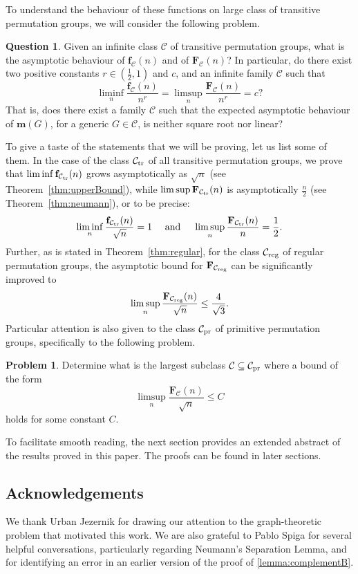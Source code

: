 \documentclass[a4paper]{amsart}
\newcommand{\f}{\mathbf{f}}
\newcommand{\F}{\mathbf{F}}
\newcommand{\m}{\mathbf{m}}
\newcommand{\C}{\mathcal{C}}
\theoremstyle{definition}
\newtheorem{question}[thmx]{Problem}
\newtheorem{vprasanje}[theorem]{Question}
\begin{document}
To understand the behaviour of these functions on large class of transitive permutation groups, we will consider the following problem.
\begin{vprasanje}\label{prob:1}
    Given an infinite class $\C$ of transitive permutation groups, what is the asymptotic behaviour of $\f_\C(n)$ and of $\F_\C(n)$? In particular, do there exist two positive constants $r \in \left(\frac{1}{2} , 1\right)$ and $c$, and an infinite family $\C$
    such that 
    \[ \liminf_n \frac{\f_\C(n)}{n^{r}} = \limsup_n \frac{\F_\C(n)}{n^{r}} = c ?\]
    That is, does there exist a family $\C$ such that the expected asymptotic behaviour of $\m(G)$, for a generic $G\in \C$, is neither square root nor linear?
\end{vprasanje}

To give a taste of the statements that we will be proving, let us list some of them.
In the case of the class $\C_{{\rm tr}}$ of all transitive permutation groups, we prove that $\liminf \f_{\C_{{\rm tr}}}(n)$ grows asymptotically as $\sqrt{n}$ (see Theorem~\ref{thm:upperBound}), while
$\limsup \F_{\C_{{\rm tr}}}(n)$ is asymptotically $\frac{n}{2}$ (see Theorem~\ref{thm:neumann}), or to be precise:
\[
\liminf_n \frac{\f_{\C_{{\rm tr}}}(n)}{\sqrt{n}} = 1 \quad \hbox{ and } \quad
\limsup_n \frac{\F_{\C_{{\rm tr}}}(n)}{n} = \frac{1}{2}.
\]
Further, as is stated in Theorem~\ref{thm:regular}, for the class $\C_{{\rm reg}}$ of regular permutation groups, the asymptotic bound for
$\F_{\C_{{\rm reg}}}$ can be significantly improved to
\[
\limsup_n \frac{\F_{\C_{{\rm reg}}}(n)}{\sqrt{n}} \le \frac{4}{\sqrt{3}}.
\]
Particular attention is also given to the class $\C_{{\rm pr}}$ of primitive permutation groups, specifically to the following problem.

\begin{question}\label{prob:primitive}
    Determine what is the largest subclass $\C \subseteq \C_{{\rm pr}}$ where a bound of the form
    \[
    \limsup_n \frac{\F_{\C}(n)}{\sqrt{n}} \le C
    \]
    holds
    for some constant $C$.
\end{question}



To facilitate smooth reading, the next section provides an extended abstract of the results proved in this paper. The proofs can be found in later sections.

\subsection{Acknowledgements} We thank Urban Jezernik for drawing our attention to the graph-theoretic problem that motivated this work. We are also grateful to Pablo Spiga for several helpful conversations, particularly regarding Neumann’s Separation Lemma, and for identifying an error in an earlier version of the proof of \cref{lemma:complementB}.
\end{document}
